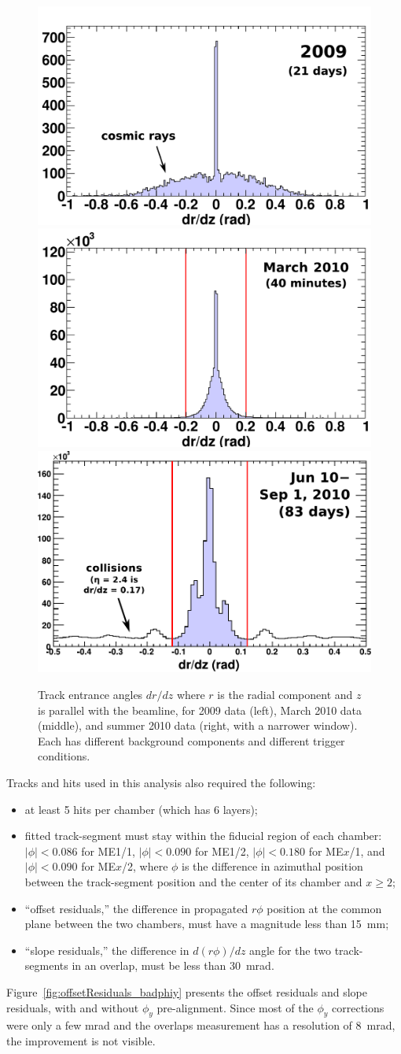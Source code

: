 \documentclass[12pt]{article}
\begin{document}
\begin{figure}
\includegraphics[height=3.5 cm]{drdz_Dec2009.pdf}
\includegraphics[height=3.5 cm]{drdz_March2010.pdf}
\includegraphics[height=3.5 cm]{drdz_Oct2010.pdf}

\caption{Track entrance angles $dr/dz$ where $r$ is the radial
  component and $z$ is parallel with the beamline, for 2009 data
  (left), March 2010 data (middle), and summer 2010 data (right, with
  a narrower window).  Each has different background components and
  different trigger conditions. \label{fig:drdz_Dec2009}}
\end{figure}

Tracks and hits used in this analysis also required the following:
\begin{itemize}
\item at least 5 hits per chamber (which has 6 layers);
\item fitted track-segment must stay within the fiducial region of
  each chamber: $|\phi| < 0.086$ for ME1/1, $|\phi| < 0.090$ for
  ME1/2, $|\phi| < 0.180$ for ME$x$/1, and $|\phi| < 0.090$ for
  ME$x$/2, where $\phi$ is the difference in azimuthal position
  between the track-segment position and the center of its chamber and
  $x \ge 2$;
\item ``offset residuals,'' the difference in propagated $r\phi$
  position at the common plane between the two chambers, must have a
  magnitude less than 15~mm;
\item ``slope residuals,'' the difference in $d(r\phi)/dz$ angle for
  the two track-segments in an overlap, must be less than 30~mrad.
\end{itemize}
Figure~\ref{fig:offsetResiduals_badphiy} presents the offset residuals
and slope residuals, with and without $\phi_y$ pre-alignment.  Since
most of the $\phi_y$ corrections were only a few mrad and the overlaps
measurement has a resolution of 8~mrad, the improvement is not
visible.
\end{document}

